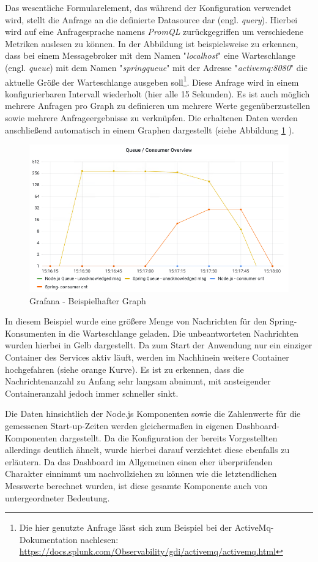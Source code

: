 Das wesentliche Formularelement, das während der Konfiguration verwendet wird, stellt die Anfrage an die definierte Datasource dar (engl. \emph{query}). Hierbei wird auf eine Anfragesprache namens \emph{PromQL} zurückgegriffen um verschiedene Metriken auslesen zu können. In der Abbildung ist beispielsweise zu erkennen, dass bei einem Messagebroker mit dem Namen "\emph{localhost}" eine Warteschlange (engl. \emph{queue}) mit dem Namen "\emph{springqueue}" mit der Adresse "\emph{activemq:8080}" die aktuelle Größe der Warteschlange ausgeben soll\footnote{Die hier genutzte Anfrage lässt sich zum Beispiel bei der ActiveMq-Dokumentation nachlesen: \url{https://docs.splunk.com/Observability/gdi/activemq/activemq.html}}. Diese Anfrage wird in einem konfigurierbaren Intervall wiederholt (hier alle 15 Sekunden). Es ist auch möglich mehrere Anfragen pro Graph zu definieren um mehrere Werte gegenüberzustellen sowie mehrere Anfrageergebnisse zu verknüpfen. Die erhaltenen Daten werden anschließend automatisch in einem Graphen dargestellt (siehe Abbildung \ref{fig:graphEx} ). 

\begin{figure}
	\centering
	\includegraphics[width=.8\linewidth]{kapitel/problemloesung/implementierung/_img/grafana-graphExample}
	\caption[]{Grafana - Beispielhafter Graph}
	\label{fig:graphEx}
\end{figure}

In diesem Beispiel wurde eine größere Menge von Nachrichten für den Spring-Konsumenten in die Warteschlange geladen. Die unbeantworteten Nachrichten wurden hierbei in Gelb dargestellt. Da zum Start der Anwendung nur ein einziger Container des Services aktiv läuft, werden im Nachhinein weitere Container hochgefahren (siehe orange Kurve). Es ist zu erkennen, dass die Nachrichtenanzahl zu Anfang sehr langsam abnimmt, mit ansteigender Containeranzahl jedoch immer schneller sinkt.

Die Daten hinsichtlich der Node.js Komponenten sowie die Zahlenwerte für die gemessenen Start-up-Zeiten werden gleichermaßen in eigenen Dashboard-Komponenten dargestellt. Da die Konfiguration der bereits Vorgestellten allerdings deutlich ähnelt, wurde hierbei darauf verzichtet diese ebenfalls zu erläutern. Da das Dashboard im Allgemeinen einen eher überprüfenden Charakter einnimmt um nachvollziehen zu können wie die letztendlichen Messwerte berechnet wurden, ist diese gesamte Komponente auch von untergeordneter Bedeutung.

